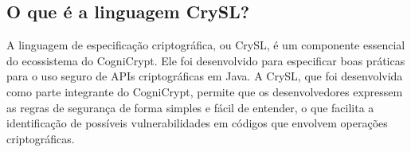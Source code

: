 

\subsection{O que é a linguagem CrySL?} %

A linguagem de especificação criptográfica, ou CrySL, é um componente essencial do ecossistema do CogniCrypt. Ele foi desenvolvido para especificar boas práticas para o uso seguro de APIs criptográficas em Java. A CrySL, que foi desenvolvida como parte integrante do CogniCrypt, permite que os desenvolvedores expressem as regras de segurança de forma simples e fácil de entender, o que facilita a identificação de possíveis vulnerabilidades em códigos que envolvem operações criptográficas. \cite{CogniCrypt}






